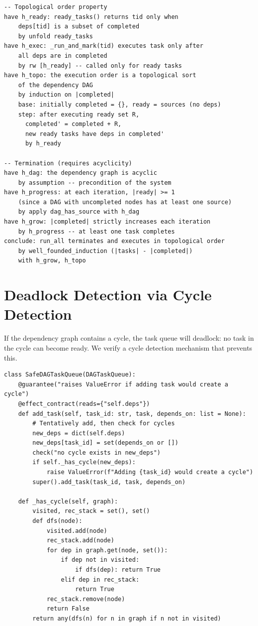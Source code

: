 \documentclass[11pt,a4paper]{report}
\theoremstyle{definition}
\theoremstyle{plain}
\begin{document}
\begin{lstlisting}[style=proof]
-- Topological order property
have h_ready: ready_tasks() returns tid only when
    deps[tid] is a subset of completed
    by unfold ready_tasks
have h_exec: _run_and_mark(tid) executes task only after
    all deps are in completed
    by rw [h_ready] -- called only for ready tasks
have h_topo: the execution order is a topological sort
    of the dependency DAG
    by induction on |completed|
    base: initially completed = {}, ready = sources (no deps)
    step: after executing ready set R,
      completed' = completed + R,
      new ready tasks have deps in completed'
      by h_ready

-- Termination (requires acyclicity)
have h_dag: the dependency graph is acyclic
    by assumption -- precondition of the system
have h_progress: at each iteration, |ready| >= 1
    (since a DAG with uncompleted nodes has at least one source)
    by apply dag_has_source with h_dag
have h_grow: |completed| strictly increases each iteration
    by h_progress -- at least one task completes
conclude: run_all terminates and executes in topological order
    by well_founded_induction (|tasks| - |completed|)
    with h_grow, h_topo
\end{lstlisting}

\section{Deadlock Detection via Cycle Detection}

If the dependency graph contains a cycle, the task queue will deadlock:
no task in the cycle can become ready.  We verify a cycle detection
mechanism that prevents this.

\begin{lstlisting}[style=synhopy]
class SafeDAGTaskQueue(DAGTaskQueue):
    @guarantee("raises ValueError if adding task would create a cycle")
    @effect_contract(reads={"self.deps"})
    def add_task(self, task_id: str, task, depends_on: list = None):
        # Tentatively add, then check for cycles
        new_deps = dict(self.deps)
        new_deps[task_id] = set(depends_on or [])
        check("no cycle exists in new_deps")
        if self._has_cycle(new_deps):
            raise ValueError(f"Adding {task_id} would create a cycle")
        super().add_task(task_id, task, depends_on)

    def _has_cycle(self, graph):
        visited, rec_stack = set(), set()
        def dfs(node):
            visited.add(node)
            rec_stack.add(node)
            for dep in graph.get(node, set()):
                if dep not in visited:
                    if dfs(dep): return True
                elif dep in rec_stack:
                    return True
            rec_stack.remove(node)
            return False
        return any(dfs(n) for n in graph if n not in visited)
\end{lstlisting}
\end{document}
